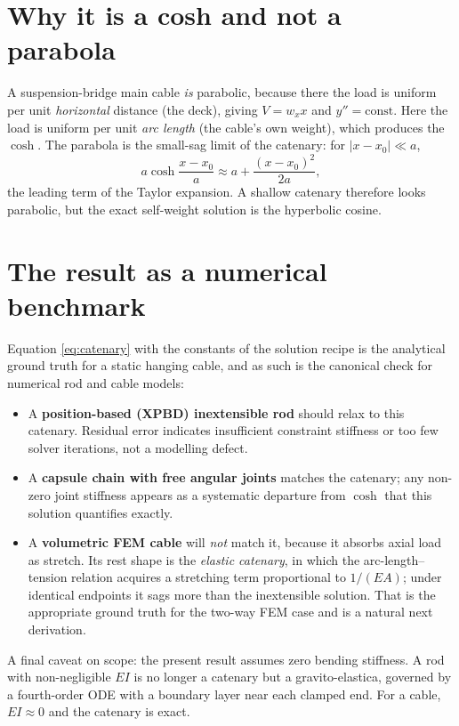 \documentclass[11pt]{article}
\theoremstyle{remark}
\begin{document}
\section{Why it is a cosh and not a parabola}
\label{sec:parabola}
A suspension-bridge main cable \emph{is} parabolic, because there the load is uniform per
unit \emph{horizontal} distance (the deck), giving $V=w_x x$ and $y''=\text{const}$. Here
the load is uniform per unit \emph{arc length} (the cable's own weight), which produces the
$\cosh$. The parabola is the small-sag limit of the catenary: for $|x-x_0|\ll a$,
\begin{equation}
  a\cosh\frac{x-x_0}{a} \approx a + \frac{(x-x_0)^2}{2a},
\end{equation}
the leading term of the Taylor expansion. A shallow catenary therefore looks parabolic,
but the exact self-weight solution is the hyperbolic cosine.

\section{The result as a numerical benchmark}
\label{sec:validation}
Equation \eqref{eq:catenary} with the constants of the solution recipe is the analytical
ground truth for a static hanging cable, and as such is the canonical check for numerical
rod and cable models:
\begin{itemize}[leftmargin=*]
  \item A \textbf{position-based (XPBD) inextensible rod} should relax to this catenary.
        Residual error indicates insufficient constraint stiffness or too few solver
        iterations, not a modelling defect.
  \item A \textbf{capsule chain with free angular joints} matches the catenary; any
        non-zero joint stiffness appears as a systematic departure from $\cosh$ that this
        solution quantifies exactly.
  \item A \textbf{volumetric FEM cable} will \emph{not} match it, because it absorbs axial
        load as stretch. Its rest shape is the \emph{elastic catenary}, in which the
        arc-length--tension relation acquires a stretching term proportional to $1/(EA)$;
        under identical endpoints it sags more than the inextensible solution. That is the
        appropriate ground truth for the two-way FEM case and is a natural next derivation.
\end{itemize}
A final caveat on scope: the present result assumes zero bending stiffness. A rod with
non-negligible $EI$ is no longer a catenary but a gravito-elastica, governed by a
fourth-order ODE with a boundary layer near each clamped end. For a cable, $EI\approx0$ and
the catenary is exact.
\end{document}
